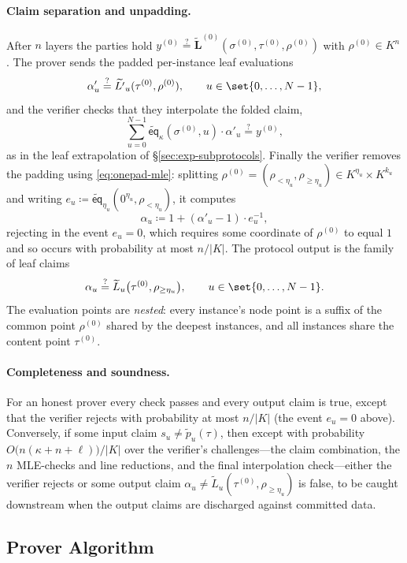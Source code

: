 \documentclass{article}
\theoremstyle{definition}
\newcommand*{\mle}{\widetilde}
\newcommand{\eq}{\mathsf{eq}}
\begin{document}
\paragraph{Claim separation and unpadding.}
After $n$ layers the parties hold $y^{(0)} \stackrel{?}{=} \mle{\mathbf{L}}^{(0)}(\sigma^{(0)}, \tau^{(0)}, \rho^{(0)})$ with $\rho^{(0)} \in K^n$. The prover sends the padded per-instance leaf evaluations
\[
  \alpha'_u \stackrel{?}{=} \mle{L'}_u(\tau^{(0)}, \rho^{(0)}), \qquad u \in \set{0, \ldots, N - 1},
\]
and the verifier checks that they interpolate the folded claim,
\[
  \sum_{u = 0}^{N - 1} \mle{\eq}_\kappa(\sigma^{(0)}, u) \cdot \alpha'_u \stackrel{?}{=} y^{(0)},
\]
as in the leaf extrapolation of \S\ref{sec:exp-subprotocols}. Finally the verifier removes the padding using \eqref{eq:onepad-mle}: splitting $\rho^{(0)} = (\rho_{< \eta_u}, \rho_{\geq \eta_u}) \in K^{\eta_u} \times K^{k_u}$ and writing $e_u \coloneqq \mle{\eq}_{\eta_u}(0^{\eta_u}, \rho_{< \eta_u})$, it computes
\[
  \alpha_u \coloneqq 1 + (\alpha'_u - 1) \cdot e_u^{-1},
\]
rejecting in the event $e_u = 0$, which requires some coordinate of $\rho^{(0)}$ to equal $1$ and so occurs with probability at most $n / |K|$. The protocol output is the family of leaf claims
\[
  \alpha_u \stackrel{?}{=} \mle{L}_u\bigl( \tau^{(0)}, \rho_{\geq \eta_u} \bigr), \qquad u \in \set{0, \ldots, N - 1}.
\]
The evaluation points are \emph{nested}: every instance's node point is a suffix of the common point $\rho^{(0)}$ shared by the deepest instances, and all instances share the content point $\tau^{(0)}$.

\paragraph{Completeness and soundness.}
For an honest prover every check passes and every output claim is true, except that the verifier rejects with probability at most $n / |K|$ (the event $e_u = 0$ above). Conversely, if some input claim $s_u \neq \mle{p}_u(\tau)$, then except with probability $O\bigl( n (\kappa + n + \ell) \bigr) / |K|$ over the verifier's challenges---the claim combination, the $n$ MLE-checks and line reductions, and the final interpolation check---either the verifier rejects or some output claim $\alpha_u \neq \mle{L}_u(\tau^{(0)}, \rho_{\geq \eta_u})$ is false, to be caught downstream when the output claims are discharged against committed data.

\subsection{Prover Algorithm}
\label{app:padded-prodcheck-prover}
\end{document}
